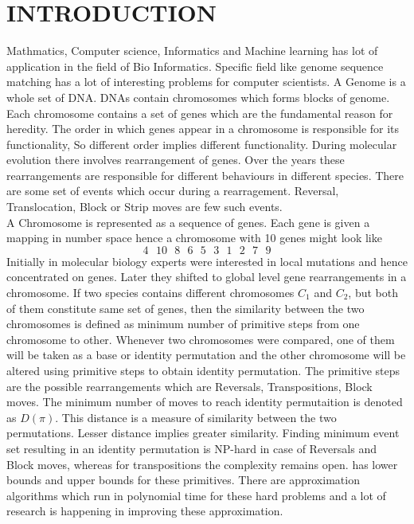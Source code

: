\documentclass[BTech]{iitmdiss}
\begin{document}
\chapter{INTRODUCTION}
\label{chap:intro}
Mathmatics, Computer science, Informatics and Machine learning has lot of application in the field of Bio Informatics. Specific field like genome sequence matching has a lot of interesting problems for computer scientists. A Genome is a whole set of DNA. DNAs contain chromosomes which forms blocks of genome. Each chromosome contains a set of genes which are the fundamental reason for heredity. The order in which genes appear in a chromosome is responsible for its functionality, So different order implies different functionality. During molecular evolution there involves rearrangement of genes. Over the years these rearrangements are responsible for different behaviours in different species. There are some set of events which occur during a rearragement. Reversal, Translocation, Block or Strip moves are few such events.\\
A Chromosome is represented as a sequence of genes. Each gene is given a mapping in number space hence a chromosome with 10 genes might look like
$$4\text{ }10\text{ }8\text{ }6\text{ }5\text{ }3\text{ }1\text{ }2\text{ }7\text{ }9$$
Initially in molecular biology experts were interested in local mutations and hence concentrated on genes. Later they shifted to global level gene rearrangements in a chromosome. If two species contains different chromosomes $C_1$ and $C_2$, but both of them constitute same set of genes, then the similarity between the two chromosomes is defined as minimum number of primitive steps from one chromosome to other. Whenever two chromosomes were compared, one of them will be taken as a base or identity permutation and the other chromosome will be altered using primitive steps to obtain identity permutation. The primitive steps are the possible rearrangements which are Reversals, Transpositions, Block moves. The minimum number of moves to reach identity permutaition is denoted as $D(\pi)$. This distance is a measure of similarity between the two permutations. Lesser distance implies greater similarity. Finding minimum event set resulting in an identity permutation is NP-hard in case of Reversals and Block moves, whereas for transpositions the complexity remains open. \cite{roy2008sorting} has lower bounds and upper bounds for these primitives. There are approximation algorithms which run in polynomial time for these hard problems and a lot of research is happening in improving these approximation. 
\end{document}
